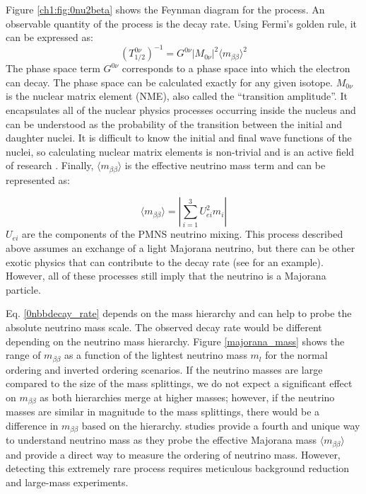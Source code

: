 Figure \ref{ch1:fig:0nu2beta} shows the Feynman diagram for the process. An observable quantity of the process is the decay rate. Using Fermi's golden rule, it can be expressed as:
\begin{equation}\label{0nbbdecay_rate}
(T^{0\nu}_{1/2})^{-1} = G^{0\nu}\left|M_{0\nu}\right|^2\langle m_{\beta\beta}\rangle^2
\end{equation}
\noindent
The phase space term $G^{0\nu}$ corresponds to a phase space into which the electron can decay. The phase space can be calculated exactly for any given isotope. $M_{0\nu}$ is the nuclear matrix element (NME), also called the ``transition amplitude''. It encapsulates all of the nuclear physics processes occurring inside the nucleus and can be understood as the probability of the transition between the initial and daughter nuclei. It is difficult to know the initial and final wave functions of the nuclei, so calculating nuclear matrix elements is non-trivial and is an active field of research \cite{Menendez:2017fdf}. Finally, $\langle m_{\beta\beta}\rangle$ is the effective neutrino mass term and can be represented as:

\begin{equation}\label{effective_mjd_mass}
\langle m_{\beta\beta}\rangle =  \left|\sum_{i=1}^{3} U^2_{ei}m_i\right|
\end{equation}
\noindent
$U_{ei}$ are the components of the PMNS neutrino mixing. This process described above assumes an exchange of a light Majorana neutrino, but there can be other exotic physics that can contribute to the decay rate (see \cite{Schechter_1982} for an example). However, all of these processes still imply that the neutrino is a Majorana particle.

Eq. \ref{0nbbdecay_rate} depends on the mass hierarchy and can help to probe the absolute neutrino mass scale. The observed decay rate would be different depending on the neutrino mass hierarchy. Figure \ref{majorana_mass} shows the range of $m_{\beta\beta}$ as a function of the lightest neutrino mass $m_l$ for the normal ordering and inverted ordering scenarios. If the neutrino masses are large compared to the size of the mass splittings, we do not expect a significant effect on $m_{\beta\beta}$ as both hierarchies merge at higher masses; however, if the neutrino masses are similar in magnitude to the mass splittings, there would be a difference in $m_{\beta\beta}$ based on the hierarchy. {\onbb} studies provide a fourth and unique way to understand neutrino mass as they probe the effective Majorana mass $\langle m_{\beta\beta}\rangle$ and provide a direct way to measure the ordering of neutrino mass. However, detecting this extremely rare process requires meticulous background reduction and large-mass experiments.

